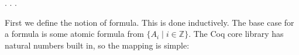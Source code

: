 \documentclass[12pt]{report}
\begin{document}

\begin{coqdoccode}
\coqdocnoindent
{}  .\coqdoceol
\coqdocnoindent
{}  .\coqdoceol
\coqdocnoindent
{}  .\coqdoceol
\coqdocemptyline
\end{coqdoccode}



First we define the notion of formula. This is done inductively. The base case for a formula is some atomic formula from $\lbrace A_i \; | \; i \in \mathbb{Z} \rbrace$. The Coq core library has natural numbers built in, so the mapping is simple:
\end{document}
